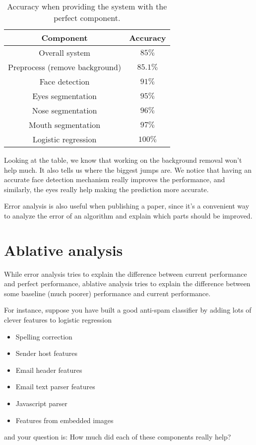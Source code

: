 \begin{table}[!h]
  \centering
  \caption{
    \label{tab:accuracy} Accuracy when providing the system with the perfect component.
  }
  \begin{tabular}{cc}
    \toprule
    \textbf{Component} & \textbf{Accuracy}\\
    \midrule
    Overall system & $85\%$ \\
    Preprocess (remove background) & $85.1\%$ \\
    Face detection & $91\%$ \\
    Eyes segmentation & $95\%$ \\
    Nose segmentation & $96\%$ \\
    Mouth segmentation & $97\%$ \\
    Logistic regression & $100\%$ \\
    \bottomrule
  \end{tabular}
\end{table}

Looking at the table, we know that working on the background removal won't help much.
It also tells us where the biggest jumps are. We notice that having an accurate face detection
mechanism really improves the performance, and similarly, the eyes really help making the
prediction more accurate.

Error analysis is also useful when publishing a paper, since it's a convenient way to
analyze the error of an algorithm and explain which parts should be improved.

\section{Ablative analysis}
While error analysis tries to explain the difference between current performance and perfect
performance, ablative analysis tries to explain the difference between some baseline (much
poorer) performance and current performance.

For instance, suppose you have built a good anti-spam classifier by adding lots of clever
features to logistic regression
\begin{itemize}
    \item Spelling correction
    \item Sender host features
    \item Email header features
    \item Email text parser features
    \item Javascript parser
    \item Features from embedded images
\end{itemize}
and your question is: How much did each of these components really help?

